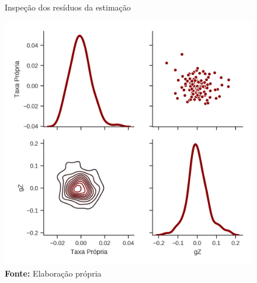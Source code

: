\begin{figure}[H]
	\centering
	\caption{Inspeção dos resíduos da estimação}
	\label{residuos}
	\includegraphics[height=.4\textheight]{Fatos_Estilizados/Figs/Residuos_4VECM.png}
	\caption*{\textbf{Fonte:} Elaboração própria}
\end{figure}



